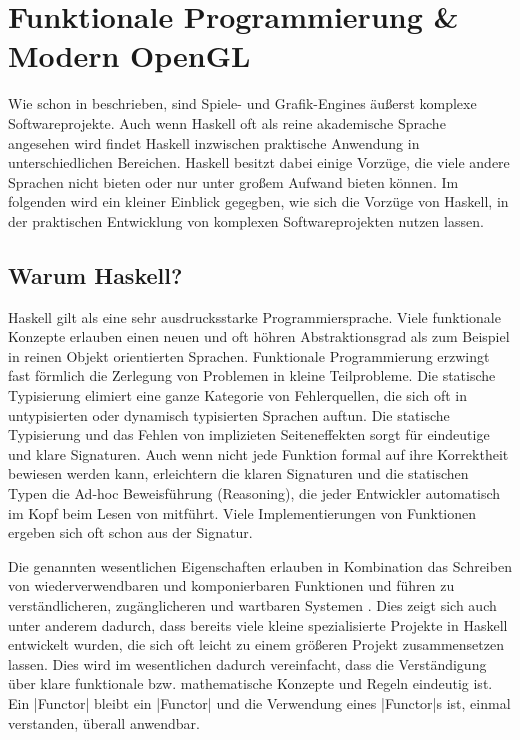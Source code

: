 \chapter{Funktionale Programmierung \& Modern OpenGL}
\label{chap:haskell-modern-gl}

Wie schon in  beschrieben, sind Spiele- und Grafik-Engines äußerst komplexe Softwareprojekte. Auch wenn Haskell oft als reine akademische Sprache angesehen wird findet Haskell inzwischen praktische Anwendung in unterschiedlichen Bereichen. Haskell besitzt dabei einige Vorzüge, die viele andere Sprachen nicht bieten oder nur unter großem Aufwand bieten können. Im folgenden wird ein kleiner Einblick gegegben, wie sich die Vorzüge von Haskell, in der praktischen Entwicklung von komplexen Softwareprojekten nutzen lassen.

\section{Warum Haskell?}\label{sec:warum-haskell}
Haskell gilt als eine sehr ausdrucksstarke Programmiersprache. Viele funktionale Konzepte erlauben einen neuen und oft höhren Abstraktionsgrad als zum Beispiel in reinen Objekt orientierten Sprachen. Funktionale Programmierung erzwingt fast förmlich die Zerlegung von Problemen in kleine Teilprobleme. Die statische Typisierung elimiert eine ganze Kategorie von Fehlerquellen, die sich oft in untypisierten oder dynamisch typisierten Sprachen auftun. Die statische Typisierung und das Fehlen von implizieten Seiteneffekten sorgt für eindeutige und klare Signaturen. Auch wenn nicht jede Funktion formal auf ihre Korrektheit bewiesen werden kann, erleichtern die klaren Signaturen und die statischen Typen die Ad-hoc Beweisführung (Reasoning), die jeder Entwickler automatisch im Kopf beim Lesen von mitführt. Viele Implementierungen von Funktionen ergeben sich oft schon aus der Signatur.

Die genannten wesentlichen Eigenschaften erlauben in Kombination das Schreiben von wiederverwendbaren und komponierbaren Funktionen und führen zu verständlicheren, zugänglicheren und wartbaren Systemen \parencite[Seite 12 ff.]{Stewart2015}. Dies zeigt sich auch unter anderem dadurch, dass bereits viele kleine spezialisierte Projekte in Haskell entwickelt wurden, die sich oft leicht zu einem größeren Projekt zusammensetzen lassen. Dies wird im wesentlichen dadurch vereinfacht, dass die Verständigung über klare funktionale bzw. mathematische Konzepte und Regeln eindeutig ist. Ein |Functor| bleibt ein |Functor| und die Verwendung eines |Functor|s ist, einmal verstanden, überall anwendbar.
\cite{Sweeney2006} %


